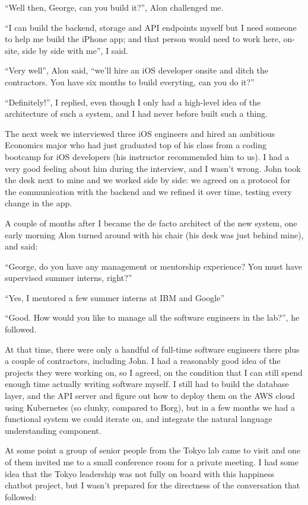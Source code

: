 \documentclass[12pt]{book}
\begin{document}
``Well then, George, can you build it?'', Alon challenged me.

``I can build the backend, storage and API endpoints myself but I need
someone to help me build the iPhone app; and that person would need to
work here, on-site, side by side with me'', I said.

``Very well'', Alon said, ``we'll hire an iOS developer onsite and ditch
the contractors. You have six months to build everyting, can you do
it?''

``Definitely!'', I replied, even though I only had a high-level idea of
the architecture of such a system, and I had never before built such a
thing.

The next week we interviewed three iOS engineers and hired an ambitious
Economics major who had just graduated top of his class from a coding
bootcamp for iOS developers (his instructor recommended him to us). I
had a very good feeling about him during the interview, and I wasn't
wrong. John took the desk next to mine and we worked side by side: we
agreed on a protocol for the communication with the backend and we
refined it over time, testing every change in the app.

A couple of months after I became the de facto architect of the new
system, one early morning Alon turned around with his chair (his desk
was just behind mine), and said:

``George, do you have any management or mentorship experience? You must
have supervised summer interns, right?''

``Yes, I mentored a few summer interns at IBM and Google''

``Good. How would you like to manage all the software engineers in the
lab?'', he followed.

At that time, there were only a handful of full-time software engineers
there plus a couple of contractors, including John. I had a reasonably
good idea of the projects they were working on, so I agreed, on the
condition that I can still spend enough time actually writing software
myself. I still had to build the database layer, and the API server and
figure out how to deploy them on the AWS cloud using Kubernetes (so
clunky, compared to Borg), but in a few months we had a functional
system we could iterate on, and integrate the natural language
understanding component.

At some point a group of senior people from the Tokyo lab came to visit
and one of them invited me to a small conference room for a private
meeting. I had some idea that the Tokyo leadership was not fully on
board with this happiness chatbot project, but I wasn't prepared for the
directness of the conversation that followed:
\end{document}
